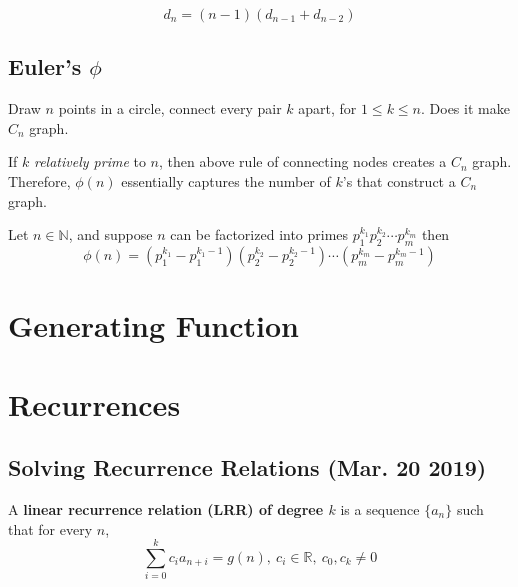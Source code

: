 \documentclass{article}
\def\R{{\mathbb R}}
\begin{document}
				\begin{proposition}
					\begin{equation}
						d_n = (n-1)(d_{n-1} + d_{n-2})
					\end{equation}
				\end{proposition}
			\subsection{Euler's $\phi$}
				\begin{example}
					Draw $n$ points in a circle, connect every pair $k$ apart, for $1 \leq k  \leq n$. Does it make $C_n$ graph.
				\end{example}
				
				\begin{theorem}
					If $k$ \emph{relatively prime} to $n$, then above rule of connecting nodes creates a $C_n$ graph. Therefore, $\phi(n)$ essentially captures the number of $k$'s that construct a $C_n$ graph.
				\end{theorem}
				
			\begin{theorem}
				Let $n \in \mathbb{N}$, and suppose $n$ can be factorized into primes $p_1^{k_1} p_2^{k_2} \cdots p_m^{k_m}$ then
				\[
					\phi(n) = (p_1^{k_1} - p_1^{k_1 - 1})(p_2^{k_2} - p_2^{k_2 - 1}) \cdots (p_m^{k_m} - p_m^{k_m - 1})
				\]
			\end{theorem}
				
		\section{Generating Function}


		\section{Recurrences}
			\subsection{Solving Recurrence Relations (Mar. 20 2019)}
				\begin{definition}
					A \textbf{linear recurrence relation (LRR) of degree $k$} is a sequence $\{a_n\}$ such that for every $n$, 
					\begin{equation}
						\sum_{i=0}^k c_i a_{n+i} = g(n),\ c_i \in \R,\ c_0, c_k \neq 0
					\end{equation}
				\end{definition}
				
\end{document}
